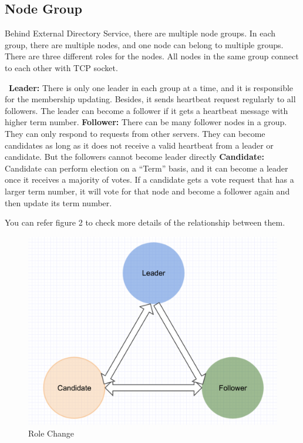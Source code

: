\documentclass[a4paper,11pt]{article}
\begin{document}
\subsection{Node Group}
Behind External Directory Service, there are multiple node groups. In each group, there are multiple nodes, and one node can belong to multiple groups. There are three different roles for the nodes. All nodes in the same group connect to each other with TCP socket.
\begin{outline}
\1 \textbf{Leader:} There is only one leader in each group at a time, and it is responsible for the membership updating. Besides, it sends heartbeat request regularly to all followers. The leader can become a follower if it gets a heartbeat message with higher term number.
\1 \textbf{Follower:} There can be many follower nodes in a group. They can only respond to requests from other servers. They can become candidates as long as it does not receive a valid heartbeat from a leader or candidate. But the followers cannot become leader directly
\1 \textbf{Candidate:} Candidate can perform election on a “Term” basis, and it can become a leader once it receives a majority of votes. If a candidate gets a vote request that has a larger term number, it will vote for that node and become a follower again and then update its term number.
\end{outline}
You can refer figure 2 to check more details of the relationship between them.
\begin{figure}
    \centering
    \includegraphics[scale=0.4]{assets/roleChange}
    \caption{Role Change}
    \label{figure2: }
\end{figure}
\end{document}
